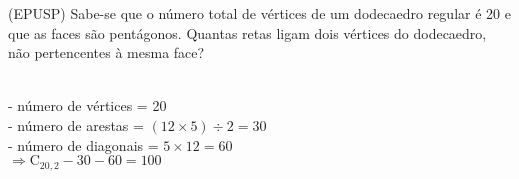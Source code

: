 \begin{ex}
 	(EPUSP) Sabe-se que o número total de vértices de um dodecaedro regular é 20 e que as faces são pentágonos. Quantas retas ligam dois vértices do dodecaedro, não pertencentes à mesma face?
 	  \begin{sol}
 	   \phantom{A} \\
 	   - número de vértices = 20 \\
 	   - número de arestas = $(12\times5) \div 2 =30$ \\
 	   - número de diagonais = $5\times12=60$  \\
 	   $\Longrightarrow \mathrm{C}_{{20},2} - 30 -60 = 100$
 	  \end{sol}
\end{ex}